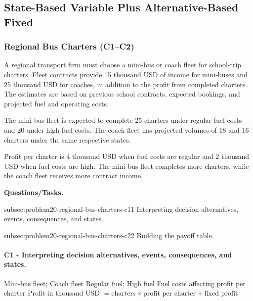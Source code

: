 	
	\subsection{State-Based Variable Plus Alternative-Based Fixed}
	\label{sec:state-based-variable-payoff-plus-alternative-based-fixed-payoff}



	\subsubsection{Regional Bus Charters (C1--C2)}
	\label{sec:problem20-regional-bus-charters-c1-c2}
	
	A regional transport firm must choose a mini-bus or coach fleet for school-trip charters. Fleet contracts provide 15 thousand USD of income for mini-buses and 25 thousand USD for coaches, in addition to the profit from completed charters. The estimates are based on previous school contracts, expected bookings, and projected fuel and operating costs.
	
	The mini-bus fleet is expected to complete 25 charters under regular fuel costs and 20 under high fuel costs. The coach fleet has projected volumes of 18 and 16 charters under the same respective states.
	
	Profit per charter is 4 thousand USD when fuel costs are regular and 2 thousand USD when fuel costs are high. The mini-bus fleet completes more charters, while the coach fleet receives more contract income.

	\textbf{Questions/Tasks.}
	\begin{enumerate}
		\CriterionTask
		{subsec:problem20-regional-bus-charters-c1}{1}
		{Interpreting decision alternatives, events, consequences, and states.}

		\CriterionTask
		{subsec:problem20-regional-bus-charters-c2}{2}
		{Building the payoff table.}
	\end{enumerate}

\paragraph*{C1 - Interpreting decision alternatives, events, consequences, and states.}
	\label{subsec:problem20-regional-bus-charters-c1}
	\DecisionElementsTable
	{Mini-bus fleet; Coach fleet}
	{Regular fuel; High fuel}
	{Fuel costs affecting profit per charter}
	{Profit in thousand USD $= \text{charters} \times \text{profit per charter} + \text{fixed profit}$}

